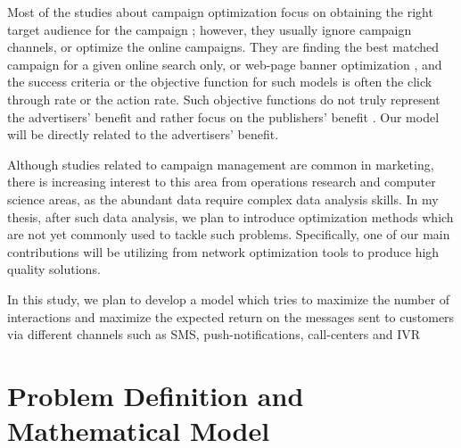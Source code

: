 \documentclass[11pt]{article}
\begin{document}
Most of the studies about campaign optimization focus on obtaining the right target audience for the campaign \citep{goul}; however, they usually ignore campaign channels, or optimize the online campaigns. They are finding the best matched campaign for a given online search only, or web-page banner optimization \citep{liu}, and the success criteria or the objective function for such models is often the click through rate or the action rate. Such objective functions do not truly represent the advertisers’ benefit and rather focus on the publishers’ benefit \citep{altshuler}. Our model will be directly related to the advertisers’ benefit.

Although studies related to campaign management are common in marketing, there is increasing interest to this area from operations research and computer science areas, as the abundant data require complex data analysis skills. In my thesis, after such data analysis, we plan to introduce optimization methods which are not yet commonly used to tackle such problems. Specifically, one of our main contributions will be utilizing from network optimization tools to produce high quality solutions. 

In this study, we plan to develop a model which tries to maximize the number of interactions and maximize the expected return on the messages sent to customers via different channels such as SMS, push-notifications, call-centers and IVR%

\section{Problem Definition and Mathematical Model}  \label{s:problemmodel}
\end{document}
